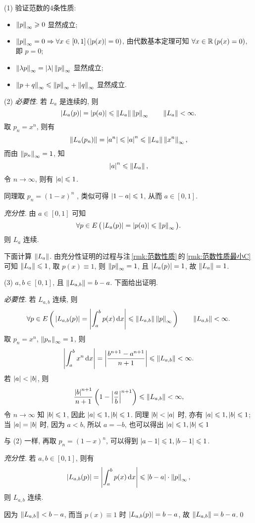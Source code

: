 	\begin{Proof}
		(1) 验证范数的4条性质:
		\begin{itemize}
			\item $ \left\| p \right\|_{\infty}\geqslant 0 $ 显然成立;
			\item $ \left\| p \right\|_{\infty}=0 \Rightarrow \forall x\in [0, 1]\,(\left| p(x) \right| =0) $, 由代数基本定理可知 $ \forall x\in\mathbb{R}\,(p(x)=0) $, 即 $ p=0 $;
			\item $ \left\| \lambda p \right\|_{\infty}=\left| \lambda \right| \left\| p \right\|_{\infty} $ 显然成立;
			\item $ \left\| p+q \right\|_{\infty}\leqslant\left\| p \right\|_{\infty}+\left\| q \right\|_{\infty} $ 显然成立.
		\end{itemize}

		(2) \textsl{必要性}. 若 $ L_{a} $ 是连续的, 则
		\[
			\left| L_{a}(p) \right| =\left| p(a) \right| \leqslant \left\| L_{a} \right\|\left\| p \right\|_{\infty}\qquad\left\| L_{a} \right\|<\infty.
		\]
		取 $ p_{n}=x^{n} $, 则有
		\[
			\left\| L_{a}(p_{n}) \right\|=\left| a^{n} \right| \leqslant\left| a \right| ^{n}\leqslant \left\| L_{a} \right\|\left\| x^{n} \right\|_{\infty},
		\]
		而由 $ \left\| p_{n} \right\|_{\infty}=1 $, 知
		\[
			\left| a \right| ^{n}\leqslant\left\| L_{a} \right\|,
		\]
		令 $ n\to\infty $, 则有 $ \left| a \right| \leqslant1 $. 

		同理取 $ p_{n}=(1-x)^{n} $ , 类似可得 $ \left| 1-a \right| \leqslant1 $, 从而 $ a\in[0, 1] $.

		\textsl{充分性}. 由 $ a\in[0, 1] $ 可知
		\[
			\forall p\in E\,\big(\left| L_{a}(p) \right| =\left| p(a) \right| \leqslant\left\| p \right\|_{\infty}\big).
		\]
		则 $ L_{a} $ 连续.

		下面计算 $ \left\| L_{a} \right\| $. 由充分性证明的过程与注\,\ref{rmk:范数性质}\,的\,\ref{rmk:范数性质最小C}\,可知 $ \left\| L_{a} \right\|\leqslant1 $, 取 $ p(x)\equiv 1 $, 则 $ \left\| p \right\|_{\infty}=1 $, 且 $ \left| L_{a}(p) \right| =1 $, 故 $ \left\| L_{a} \right\|=1 $.

		(3) $ a, b\in[0, 1] $, 且 $ \left\| L_{a, b} \right\|=b-a $. 下面给出证明.

		\textsl{必要性}. 若 $ L_{a, b} $ 连续, 则
		\[
			\forall p\in E\,\bigg(\left| L_{a, b}(p) \right| =\left| \int_{a}^{b}p(x)\,\mathrm{d} x \right| \leqslant \left\| L_{a, b} \right\|\left\| p \right\|_{\infty}\bigg)\qquad \left\| L_{a, b} \right\|<\infty.
		\]
		取 $ p_{n}=x^{n} $, $ \left\| p_{n} \right\|_{\infty}=1 $, 则
		\[
			\left| \int_{a}^{b}x^{n}\,\mathrm{d} x \right| =\left| \frac{b^{n+1}-a^{n+1}}{n+1} \right| \leqslant\left\| L_{a, b} \right\|<\infty.
		\]
		若 $ \left| a \right| <\left| b \right|  $, 则
		\[
			\frac{\left| b \right| ^{n+1}}{n+1}\left( 1-\left| \frac{a}{b} \right| ^{n+1} \right) \leqslant \left\| L_{a, b} \right\|<\infty,
		\]
		令 $ n\to\infty $ 知 $ \left| b \right| \leqslant1 $, 因此 $ \left| a \right| \leqslant1, \left| b \right| \leqslant1 $. 同理 $ \left| b \right| <\left| a \right|  $ 时, 亦有 $ \left| a \right| \leqslant1, \left| b \right| \leqslant1 $; 当 $ \left| a \right| =\left| b \right|  $ 时, 因为 $ a<b $, 所以 $ a=-b $, 也可以得出 $ \left| a \right| \leqslant1, \left| b \right| \leqslant1 $

		与 (2) 一样, 再取 $ p_{n}=(1-x)^{n} $, 可以得到 $ \left| a-1 \right| \leqslant1, \left| b-1 \right| \leqslant1 $.

		\textsl{充分性}. 若 $ a, b\in[0, 1] $, 则有
		\[
			\left| L_{a, b}(p) \right| =\left| \int_{a}^{b}p(x)\,\mathrm{d} x \right| \leqslant \left| b-a \right| \cdot \left\| p \right\|_{\infty},
		\]
		则 $ L_{a, b} $ 连续. 

		因为 $ \left\| L_{a, b} \right\|<b-a $, 而当 $ p(x)\equiv 1 $ 时 $ \left| L_{a, b}(p) \right| =b-a $, 故 $ \left\| L_{a, b} \right\|=b-a $.\qed
	\end{Proof}

